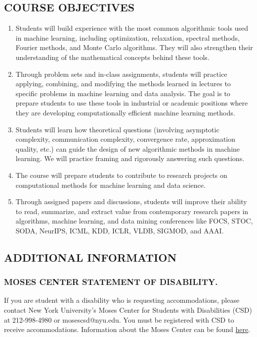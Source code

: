 \documentclass[10pt]{article}
\begin{document}
\subsection{COURSE OBJECTIVES}
\begin{enumerate}
	\item Students will build experience with the most common algorithmic tools used in machine learning, including optimization, relaxation, spectral methods, Fourier methods, and Monte Carlo algorithms. They will also strengthen their understanding of the mathematical concepts behind these tools.
	
	\item Through problem sets and in-class assignments, students will practice applying, combining, and modifying the methods learned in lectures to specific problems in machine learning and data analysis. The goal is to prepare students to use these tools in industrial or academic positions where they are developing computationally efficient machine learning methods.
	
	\item Students will learn how theoretical questions (involving asymptotic complexity, communication complexity, convergence rate, approximation quality, etc.) can guide the design of new algorithmic methods in machine learning. We will practice framing and rigorously answering such questions.
	
	\item The course will prepare students to contribute to research projects on computational methods for machine learning and data science.
	
	\item Through assigned papers and discussions, students will improve their ability to read, summarize, and extract value from contemporary research papers in algorithms, machine learning, and data mining conferences like FOCS, STOC, SODA, NeurIPS, ICML, KDD, ICLR, VLDB, SIGMOD, and AAAI.
\end{enumerate}

\subsection{ADDITIONAL INFORMATION}

\subsubsection{MOSES CENTER STATEMENT OF DISABILITY.}
If you are student with a disability who is requesting accommodations, please contact New York University's Moses Center for Students with Disabilities (CSD) at 212-998-4980 or mosescsd@nyu.edu.  You must be registered with CSD to receive accommodations.  Information about the Moses Center can be found \href{https://www.nyu.edu/students/communities-and-groups/students-with-disabilities.html}{here}.
\end{document}
